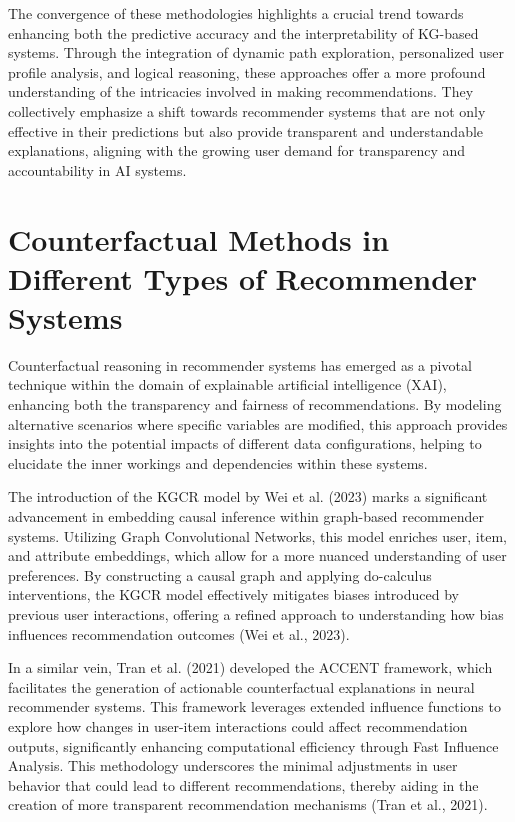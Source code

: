 The convergence of these methodologies highlights a crucial trend towards enhancing both the predictive accuracy and the interpretability of KG-based systems. Through the integration of dynamic path exploration, personalized user profile analysis, and logical reasoning, these approaches offer a more profound understanding of the intricacies involved in making recommendations. They collectively emphasize a shift towards recommender systems that are not only effective in their predictions but also provide transparent and understandable explanations, aligning with the growing user demand for transparency and accountability in AI systems.


\section{Counterfactual Methods in Different Types of Recommender Systems}

Counterfactual reasoning in recommender systems has emerged as a pivotal technique within the domain of explainable artificial intelligence (XAI), enhancing both the transparency and fairness of recommendations. By modeling alternative scenarios where specific variables are modified, this approach provides insights into the potential impacts of different data configurations, helping to elucidate the inner workings and dependencies within these systems.

The introduction of the KGCR model by Wei et al. (2023) marks a significant advancement in embedding causal inference within graph-based recommender systems. Utilizing Graph Convolutional Networks, this model enriches user, item, and attribute embeddings, which allow for a more nuanced understanding of user preferences. By constructing a causal graph and applying do-calculus interventions, the KGCR model effectively mitigates biases introduced by previous user interactions, offering a refined approach to understanding how bias influences recommendation outcomes (Wei et al., 2023).

In a similar vein, Tran et al. (2021) developed the ACCENT framework, which facilitates the generation of actionable counterfactual explanations in neural recommender systems. This framework leverages extended influence functions to explore how changes in user-item interactions could affect recommendation outputs, significantly enhancing computational efficiency through Fast Influence Analysis. This methodology underscores the minimal adjustments in user behavior that could lead to different recommendations, thereby aiding in the creation of more transparent recommendation mechanisms (Tran et al., 2021).

